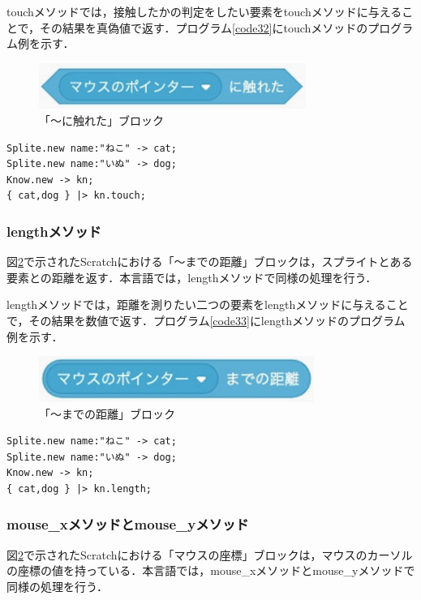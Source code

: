\documentclass[10pt,a4j]{ltjsarticle}
\begin{document}
touchメソッドでは，接触したかの判定をしたい要素をtouchメソッドに与えることで，その結果を真偽値で返す．プログラム\ref{code32}にtouchメソッドのプログラム例を示す．
\begin{figure}[H]
  \centering
  \includegraphics[height=15mm]{images/touch.pdf}
  \caption{「〜に触れた」ブロック}
  \label{fig:touch}
\end{figure}

\begin{lstlisting}[caption=touchメソッドのプログラム例, label=code32]
Splite.new name:"ねこ" -> cat;
Splite.new name:"いぬ" -> dog;
Know.new -> kn;
{ cat,dog } |> kn.touch;
\end{lstlisting}

\subsubsection{lengthメソッド}
図\ref{fig:length}で示されたScratchにおける「〜までの距離」ブロックは，スプライトとある要素との距離を返す．本言語では，lengthメソッドで同様の処理を行う．

lengthメソッドでは，距離を測りたい二つの要素をlengthメソッドに与えることで，その結果を数値で返す．プログラム\ref{code33}にlengthメソッドのプログラム例を示す．

\begin{figure}[H]
  \centering
  \includegraphics[height=15mm]{images/mouse.pdf}
  \caption{「〜までの距離」ブロック}
  \label{fig:length}
\end{figure}

\begin{lstlisting}[caption=lengthメソッドのプログラム例, label=code33]
Splite.new name:"ねこ" -> cat;
Splite.new name:"いぬ" -> dog;
Know.new -> kn;
{ cat,dog } |> kn.length;
\end{lstlisting}

\subsubsection{mouse\_xメソッドとmouse\_yメソッド}
図\ref{fig:length}で示されたScratchにおける「マウスの座標」ブロックは，マウスのカーソルの座標の値を持っている．本言語では，mouse\_xメソッドとmouse\_yメソッドで同様の処理を行う．
\end{document}
